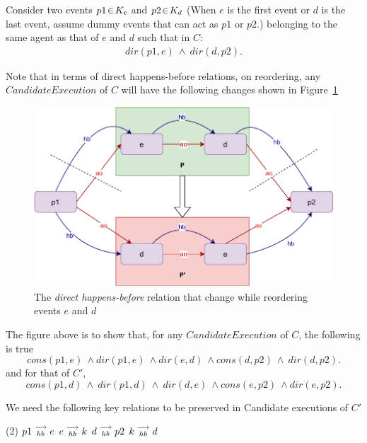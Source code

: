     Consider two events $p1\!\in\!K_e$ and $p2\!\in\!K_d$ (When $e$ is the first event or $d$ is the last event, assume dummy events that can act as $p1$ or $p2$.) belonging to the same agent as that of $e$ and $d$ such that in $C$:
    \begin{align*}
        dir(p1,e)\ \wedge\ dir(d,p2).
    \end{align*}
    
    Note that in terms of direct happens-before relations, on reordering, any $Candidate Execution$ of $C$ will have the following changes shown in Figure~\ref{reord:preserve_hb(b)}
    \begin{figure}[H]
        \centering
        \includegraphics[scale=0.7]{5.InstructionReordering/4.ValidReorderingCandidate/ProofParts/Part1/part1(b).pdf}
        \caption{The \textit{direct happens-before} relation that change while reordering events $e$ and $d$}
        \label{reord:preserve_hb(b)}
    \end{figure}
    
    The figure above is to show that, for any $Candidate Execution$ of $C$, the following is true
    \[
        cons(p1,e) \ \wedge dir(p1,e) \ \wedge dir(e,d) \ \wedge cons(d,p2) \ \wedge \ dir(d,p2).
    \]
    and for that of $C'$,
    \[
        cons(p1,d) \ \wedge \ dir(p1,d) \ \wedge \ dir(d,e) \ \wedge cons(e,p2) \ \wedge dir(e,p2).
    \]
    
    We need the following key relations to be preserved in Candidate executions of $C'$ 
    \begin{tasks}(2)
        \task $p1\stackrel{\longrightarrow}{_{hb}}e$
        \task $e\stackrel{\longrightarrow}{_{hb}}k$
        \task $d\stackrel{\longrightarrow}{_{hb}}p2$
        \task $k\stackrel{\longrightarrow}{_{hb}}d$ 
    \end{tasks}

